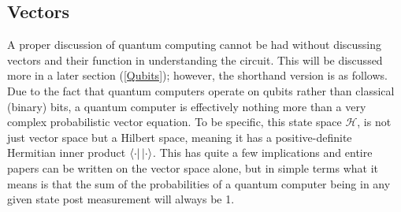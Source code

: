 \documentclass[a4paper]{article}
\begin{document}
\subsection{Vectors}
\label{THISNEEDSACCURACYREVIEW} %
A proper discussion of quantum computing cannot be had without discussing vectors and their function in understanding the circuit.  This will be discussed more in a later section (\ref{Qubits}); however, the shorthand version is as follows.  Due to the fact that quantum computers operate on qubits rather than classical (binary) bits, a quantum computer is effectively nothing more than a very complex probabilistic vector equation. To be specific, this state space $\mathcal{H}$, is not just vector space but a Hilbert space, meaning it has a positive-definite Hermitian inner product $\left\langle{\cdot}\right\vert\left\vert{\cdot}\right\rangle$.  This has quite a few implications and entire papers can be written on the vector space alone, but in simple terms what it means is that the sum of the probabilities of a quantum computer being in any given state post measurement will always be 1.
\end{document}
